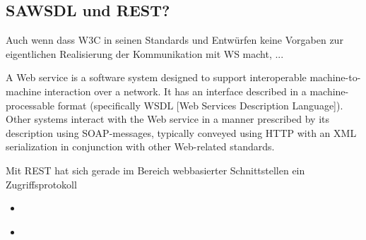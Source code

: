\subsection{\ac{SAWSDL} und \ac{REST}?}

Auch wenn dass \ac{W3C} in seinen Standards und Entwürfen keine Vorgaben zur eigentlichen Realisierung der Kommunikation mit \acl{WS} macht, ...

A Web service is a software system designed to support interoperable machine-to-machine interaction over a network. It has an interface described in a machine-processable format (specifically WSDL [Web Services Description
Language]). Other systems interact with the Web service in a manner prescribed by its description using SOAP-messages, typically conveyed using
HTTP with an XML serialization in conjunction with other Web-related standards.


Mit \ac{REST} hat sich gerade im Bereich webbasierter Schnittstellen ein Zugriffsprotokoll 

\begin{itemize}
\item \cite{ma-sawslrest}
\item \cite{xn-sss}
\end{itemize}